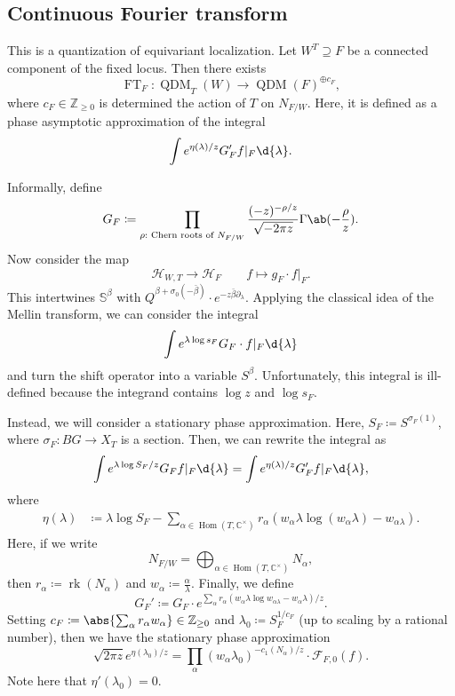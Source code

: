 \documentclass{amsart}
\theoremstyle{definition}
\theoremstyle{remark}
\theoremstyle{plain}
\theoremstyle{definition}
\theoremstyle{remark}
\newcommand{\C}{\mathbb{C}}
\newcommand{\Z}{\mathbb{Z}}
\newcommand{\bS}{\mathbb{S}}
\renewcommand{\mc}[1]{\mathcal{#1}}
\newcommand{\on}[1]{\operatorname{#1}}
\newcommand{\1}{\mathbf{1}}
\newcommand{\2}{\mathbf{2}}
\newcommand{\3}{\mathbf{3}}
\DeclareMathOperator{\Hom}{Hom}
\DeclareMathOperator{\QDM}{QDM}
\begin{document}
\subsection{Continuous Fourier transform}%
\label{sub:Continuous Fourier transform}

This is a quantization of equivariant localization. Let \(W^T \supseteq F\) be a connected component of the fixed locus. Then there exists 
\[ \on{FT}_F \colon \QDM_T(W) \to \QDM(F)^{\oplus c_F}, \]
where \(c_F \in \Z_{\geq 0}\) is determined the action of \(T\) on \(N_{F/W}\). Here, it is defined as a phase asymptotic approximation of the integral
\[ \int e^{\eta(\lambda)/z} G_F' f|_F \d{\lambda}. \]

Informally, define
\[ G_F \coloneqq \prod_{\rho: \text{ Chern roots of } N_{F/W}} \frac{(-z)^{-\rho/z}}{\sqrt{-2\pi z}} \Gamma\ab(-\frac{\rho}{z}). \]
Now consider the map
\[ \mc{H}_{W,T} \to \mc{H}_F \qquad f \mapsto g_F \cdot f|_F. \]
This intertwines \(\bS^{\beta}\) with \(Q^{\beta + \sigma_0(-\bar{\beta})} \cdot e^{-z \bar{\beta} \partial_{\lambda}}\). Applying the classical idea of the Mellin transform, we can consider the integral
\[ \int e^{\lambda \log s_F} G_F \cdot f|_F \d{\lambda} \]
and turn the shift operator into a variable \(S^{\beta}\). Unfortunately, this integral is ill-defined because the integrand contains \(\log z\) and \(\log s_F\).

Instead, we will consider a stationary phase approximation. Here, \(S_F \coloneqq S^{\sigma_F(1)}\), where \(\sigma_F \colon BG \to X_T\) is a section. Then, we can rewrite the integral as
\[ \int e^{\lambda \log S_F/z} G_F f|_F \d{\lambda} = \int e^{\eta(\lambda)/z} G_F' f|_F \d{\lambda}, \]
where
\begin{align*}
    \eta(\lambda) &\coloneqq \lambda \log S_F - \sum_{\alpha \in \Hom(T, \C^{\times})} r_{\alpha}(w_{\alpha} \lambda \log (w_{\alpha} \lambda) - w_{\alpha \lambda}).
\end{align*}
Here, if we write
\[ N_{F/W} = \bigoplus_{\alpha \in \Hom(T, \C^{\times})} N_{\alpha}, \]
then \(r_{\alpha} \coloneqq \on{rk}(N_{\alpha})\) and \(w_{\alpha} \coloneqq \frac{\alpha}{\lambda}\). Finally, we define
\[ G_F' \coloneqq G_F \cdot e^{\sum_{\alpha} r_{\alpha}(w_{\alpha}\lambda \log w_{\alpha \lambda} - w_{\alpha} \lambda)/z}. \] 
Setting \(c_F \coloneqq \abs{\sum_{\alpha} r_{\alpha} w_{\alpha}} \in \Z_{\geq 0}\) and \(\lambda_0 \coloneqq S_F^{1/c_F}\) (up to scaling by a rational number), then we have the stationary phase approximation
\[ \sqrt{2 \pi z} e^{\eta(\lambda_0)/z} = \prod_{\alpha} (w_{\alpha} \lambda_0)^{-c_1(N_{\alpha})/z} \cdot \mc{F}_{F, 0}(f). \]
Note here that \(\eta'(\lambda_0) = 0\).
\end{document}
